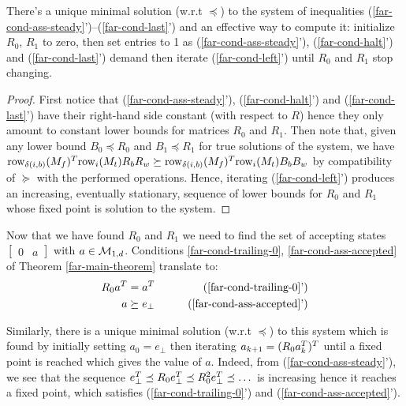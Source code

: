 \begin{lemma}\normalfont\label{lem:far-unique-min}
  There's a unique minimal solution (w.r.t $\preceq$) to the system  of inequalities (\ref{far-cond-ass-steady}')--(\ref{far-cond-last}') and an effective way to compute it: initialize $R_0$, $R_1$ to zero,
  then set entries to 1 as (\ref{far-cond-ass-steady}'), (\ref{far-cond-halt}') and (\ref{far-cond-last}') demand then iterate (\ref{far-cond-left}') until $R_0$ and $R_1$ stop changing.
\end{lemma}
\begin{proof}

  First notice that (\ref{far-cond-ass-steady}'), (\ref{far-cond-halt}') and (\ref{far-cond-last}') have their right-hand side constant (with respect to $R$) hence they only amount to constant lower bounds for matrices $R_0$ and $R_1$. Then note that, given any lower bound $B_0\preceq R_0$ and $B_1\preceq R_1$ for true solutions of the system, we have  $\text{row}_{\delta(i,b)}(M_f)^T \text{row}_i(M_t)R_b R_w \succeq \text{row}_{\delta(i,b)}(M_f)^T \text{row}_i(M_t)B_b B_w$ by compatibility of $\succeq$ with the performed operations. Hence, iterating (\ref{far-cond-left}') produces an increasing, eventually stationary, sequence of lower bounds for $R_0$ and $R_1$ whose fixed point is solution to the system.
\end{proof}


Now that we have found $R_0$ and $R_1$ we need to find the set of accepting states $\begin{bmatrix}0&a\end{bmatrix}$ with $a \in \mathcal{M}_{1,d}$.
Conditions \eqref{far-cond-trailing-0}, \eqref{far-cond-ass-accepted} of Theorem \ref{far-main-theorem}   translate to:
\begin{align}
  R_0 a\T & = a\T
             &
  \tag{\ref{far-cond-trailing-0}'}
  \\
  a          & \succeq e_{\bot}
             &
  \tag{\ref{far-cond-ass-accepted}'}
\end{align}

Similarly, there is a unique minimal solution (w.r.t $\preceq$) to this system which is found by initially setting $a_0 = e_\bot$ then iterating $a_{k+1} = (R_0 a_{k}^T)^T$ until a fixed point is reached which gives the value of $a$. Indeed, from (\ref{far-cond-ass-steady}'), we see that the sequence $e_\bot^T \preceq  R_0 e_\bot^T\preceq R_0^2 e_\bot^T  \preceq\dots$ is increasing hence it reaches a fixed point, which satisfies (\ref{far-cond-trailing-0}') and (\ref{far-cond-ass-accepted}').

